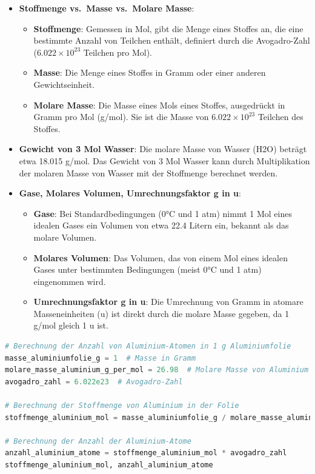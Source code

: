 \documentclass{vorlage-design-main}
\begin{document}
\begin{itemize}
\item
  \textbf{Stoffmenge vs.~Masse vs.~Molare Masse}:

  \begin{itemize}
  
  \item
    \textbf{Stoffmenge}: Gemessen in Mol, gibt die Menge eines Stoffes
    an, die eine bestimmte Anzahl von Teilchen enthält, definiert durch
    die Avogadro-Zahl ($6.022 \times 10^{23}$ Teilchen pro Mol).
  \item
    \textbf{Masse}: Die Menge eines Stoffes in Gramm oder einer anderen
    Gewichtseinheit.
  \item
    \textbf{Molare Masse}: Die Masse eines Mols eines Stoffes,
    ausgedrückt in Gramm pro Mol (g/mol). Sie ist die Masse von
    $6.022 \times 10^{23}$ Teilchen des Stoffes.
  \end{itemize}
\item
  \textbf{Gewicht von 3 Mol Wasser}: Die molare Masse von Wasser (H2O)
  beträgt etwa 18.015 g/mol. Das Gewicht von 3 Mol Wasser kann durch
  Multiplikation der molaren Masse von Wasser mit der Stoffmenge
  berechnet werden.
\item
  \textbf{Gase, Molares Volumen, Umrechnungsfaktor g in u}:

  \begin{itemize}
  
  \item
    \textbf{Gase}: Bei Standardbedingungen (0°C und 1 atm) nimmt 1 Mol
    eines idealen Gases ein Volumen von etwa 22.4 Litern ein, bekannt
    als das molare Volumen.
  \item
    \textbf{Molares Volumen}: Das Volumen, das von einem Mol eines
    idealen Gases unter bestimmten Bedingungen (meist 0°C und 1 atm)
    eingenommen wird.
  \item
    \textbf{Umrechnungsfaktor g in u}: Die Umrechnung von Gramm in
    atomare Masseneinheiten (u) ist direkt durch die molare Masse
    gegeben, da 1 g/mol gleich 1 u ist.
  \end{itemize}
\end{itemize}

\begin{lstlisting}[language=Python]
# Berechnung der Anzahl von Aluminium-Atomen in 1 g Aluminiumfolie
masse_aluminiumfolie_g = 1  # Masse in Gramm
molare_masse_aluminium_g_per_mol = 26.98  # Molare Masse von Aluminium in g/mol
avogadro_zahl = 6.022e23  # Avogadro-Zahl

# Berechnung der Stoffmenge von Aluminium in der Folie
stoffmenge_aluminium_mol = masse_aluminiumfolie_g / molare_masse_aluminium_g_per_mol

# Berechnung der Anzahl der Aluminium-Atome
anzahl_aluminium_atome = stoffmenge_aluminium_mol * avogadro_zahl
stoffmenge_aluminium_mol, anzahl_aluminium_atome
\end{lstlisting}
\end{document}
